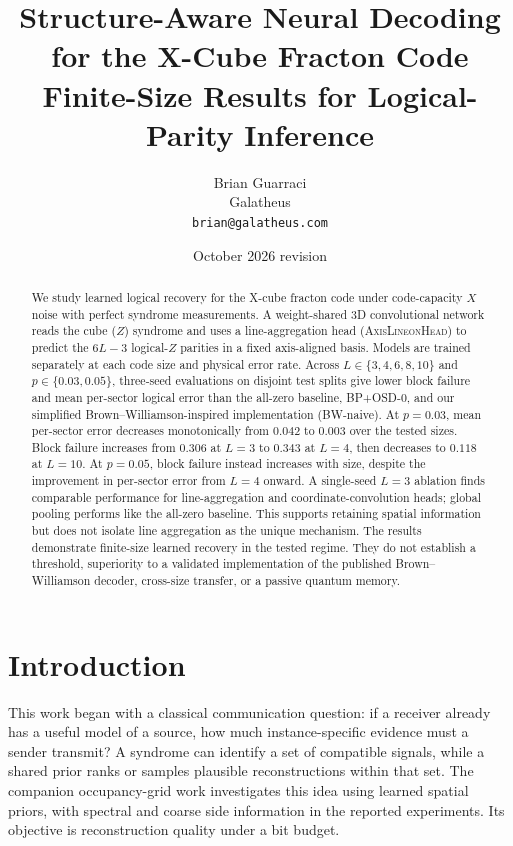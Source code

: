 \documentclass[11pt,a4paper]{article}
\title{Structure-Aware Neural Decoding for the X-Cube Fracton Code\\
\large Finite-Size Results for Logical-Parity Inference}
\author{Brian Guarraci\\
  Galatheus\\
  \texttt{brian@galatheus.com}}
\date{October 2026 revision}
\begin{document}
\maketitle

\begin{abstract}
We study learned logical recovery for the X-cube fracton code under
code-capacity $X$ noise with perfect syndrome measurements. A weight-shared
3D convolutional network reads the cube ($Z$) syndrome and uses a
line-aggregation head (\textsc{AxisLineonHead}) to predict the $6L-3$
logical-$Z$ parities in a fixed axis-aligned basis. Models are trained
separately at each code size and physical error rate. Across
$L\in\{3,4,6,8,10\}$ and $p\in\{0.03,0.05\}$, three-seed evaluations
on disjoint test splits give lower block failure and mean per-sector
logical error than the all-zero baseline, BP+OSD-0, and our simplified
Brown--Williamson-inspired implementation (BW-naive).
At $p=0.03$, mean per-sector error decreases monotonically from $0.042$
to $0.003$ over the tested sizes. Block failure increases from $0.306$
at $L=3$ to $0.343$ at $L=4$, then decreases to $0.118$ at $L=10$.
At $p=0.05$, block failure instead increases with size, despite the
improvement in per-sector error from $L=4$ onward. A single-seed
$L=3$ ablation finds comparable performance for line-aggregation and
coordinate-convolution heads; global pooling performs like the all-zero
baseline. This supports retaining spatial information but does not isolate
line aggregation as the unique mechanism. The results demonstrate
finite-size learned recovery in the tested regime. They do not establish
a threshold, superiority to a validated implementation of the published
Brown--Williamson decoder, cross-size transfer, or a passive quantum memory.

\end{abstract}

\section{Introduction}
\label{sec:intro}
This work began with a classical communication question: if a receiver
already has a useful model of a source, how much instance-specific evidence
must a sender transmit? A syndrome can identify a set of compatible signals,
while a shared prior ranks or samples plausible reconstructions within that
set. The companion occupancy-grid work investigates this idea using learned
spatial priors, with spectral and coarse side information in the reported
experiments. Its objective is reconstruction quality under a bit budget.
\end{document}
